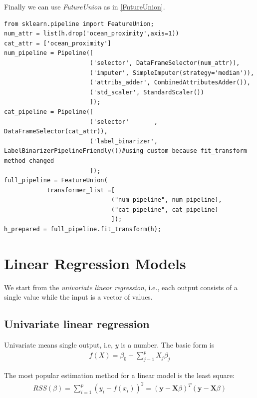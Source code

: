 \documentclass[12pt, letterpaper]{article}
\theoremstyle{definition}
\let\ti\textit
\begin{document}
Finally we can use \ti{FutureUnion} as in \autoref{FutureUnion}.
\begin{lstlisting}[caption=Usage of \ti{FutureUnion}, label=FutureUnion]
from sklearn.pipeline import FeatureUnion;
num_attr = list(h.drop('ocean_proximity',axis=1))
cat_attr = ['ocean_proximity']
num_pipeline = Pipeline([
                        ('selector', DataFrameSelector(num_attr)),
                        ('imputer', SimpleImputer(strategy='median')),
                        ('attribs_adder', CombinedAttributesAdder()),
                        ('std_scaler', StandardScaler())
                        ]);
cat_pipeline = Pipeline([
                        ('selector'       , DataFrameSelector(cat_attr)),
                        ('label_binarizer', LabelBinarizerPipelineFriendly())#using custom because fit_transform method changed
                        ]);
full_pipeline = FeatureUnion(
            transformer_list =[
                              ("num_pipeline", num_pipeline), 
                              ("cat_pipeline", cat_pipeline)
                              ]);
h_prepared = full_pipeline.fit_transform(h);
\end{lstlisting} 

\newpage
\section{Linear Regression Models}
We start from the \textit{univariate linear regression}, i.e., each output consists of a single value while the input is a vector of values.

\subsection{Univariate linear regression}
Univariate means single output, i.e, $y$ is a number. The basic form is 
\begin{align}
f(X) = \beta_0 + \sum_{j-1}^p X_j \beta_j
\end{align}

The most popular estimation method for a linear model is the least square:
\begin{align}
RSS(\beta) = \sum_{i=1}^{p}  \left( y_i - f(x_i) \right)^2 = \left(\bm{y} - \bm{X}\beta\right)^T \left(\bm{y} - \bm{X}\beta\right)
\end{align}
\end{document}
